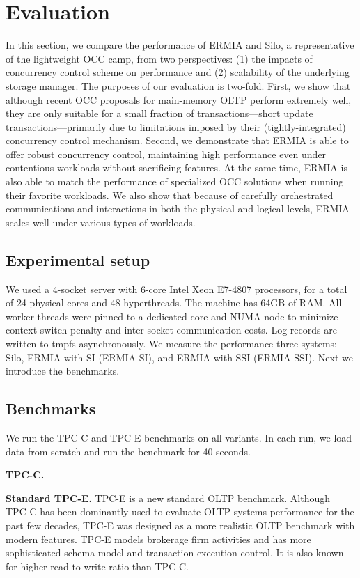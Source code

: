 
\section{Evaluation}
In this section, we compare the performance of ERMIA and Silo, a representative of the lightweight OCC camp, from two perspectives: (1) the impacts of concurrency control scheme on performance and (2) scalability of the underlying storage manager. The purposes of our evaluation is two-fold. First, we show that although recent OCC proposals for main-memory OLTP perform extremely well, they are only suitable for a small fraction of transactions---short update transactions---primarily due to limitations imposed by their (tightly-integrated) concurrency control mechanism. Second, we demonstrate that ERMIA is able to offer robust concurrency control, maintaining high performance even under contentious workloads without sacrificing features. At the same time, ERMIA is also able to match the performance of specialized OCC solutions when running their favorite workloads. We also show that because of carefully orchestrated communications and interactions in both the physical and logical levels, ERMIA scales well under various types of workloads.

\subsection{Experimental setup}
We used a 4-socket server with 6-core Intel Xeon E7-4807 processors, for a total of 24 physical cores and 48 hyperthreads. The machine has 64GB of RAM. All worker threads were pinned to a dedicated core and NUMA node to minimize context switch penalty and inter-socket communication costs. Log records are written to tmpfs asynchronously. We measure the performance three systems: Silo, ERMIA with SI (ERMIA-SI), and ERMIA with SSI (ERMIA-SSI). Next we introduce the benchmarks.

\subsection{Benchmarks}
We run the TPC-C and TPC-E benchmarks on all variants. In each run, we load data from scratch and run the benchmark for 40 seconds.

\textbf{TPC-C.}

\textbf{Standard TPC-E.}
TPC-E is a new standard OLTP benchmark. Although TPC-C has been dominantly used to evaluate OLTP systems performance for the past few decades, TPC-E was designed as a more realistic OLTP benchmark with modern features.  TPC-E models brokerage firm activities and has more sophisticated schema model and transaction execution control. It is also known for higher read to write ratio than TPC-C.


